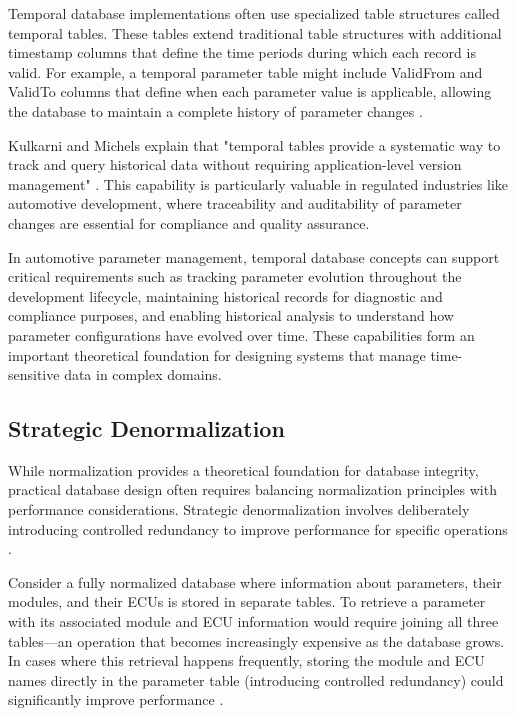 Temporal database implementations often use specialized table structures called temporal tables. These tables extend traditional table structures with additional timestamp columns that define the time periods during which each record is valid. For example, a temporal parameter table might include ValidFrom and ValidTo columns that define when each parameter value is applicable, allowing the database to maintain a complete history of parameter changes \cite{salzberg1999comparison}.

Kulkarni and Michels explain that "temporal tables provide a systematic way to track and query historical data without requiring application-level version management" \cite{kulkarni2012temporal}. This capability is particularly valuable in regulated industries like automotive development, where traceability and auditability of parameter changes are essential for compliance and quality assurance.

In automotive parameter management, temporal database concepts can support critical requirements such as tracking parameter evolution throughout the development lifecycle, maintaining historical records for diagnostic and compliance purposes, and enabling historical analysis to understand how parameter configurations have evolved over time. These capabilities form an important theoretical foundation for designing systems that manage time-sensitive data in complex domains.

\subsection{Strategic Denormalization}
\label{subsec:strategic-denormalization}

While normalization provides a theoretical foundation for database integrity, practical database design often requires balancing normalization principles with performance considerations. Strategic denormalization involves deliberately introducing controlled redundancy to improve performance for specific operations \cite{bhattacherjee2015principles}.

Consider a fully normalized database where information about parameters, their modules, and their \acp{ECU} is stored in separate tables. To retrieve a parameter with its associated module and \ac{ECU} information would require joining all three tables—an operation that becomes increasingly expensive as the database grows. In cases where this retrieval happens frequently, storing the module and \ac{ECU} names directly in the parameter table (introducing controlled redundancy) could significantly improve performance \cite{schwartz2012high}.

